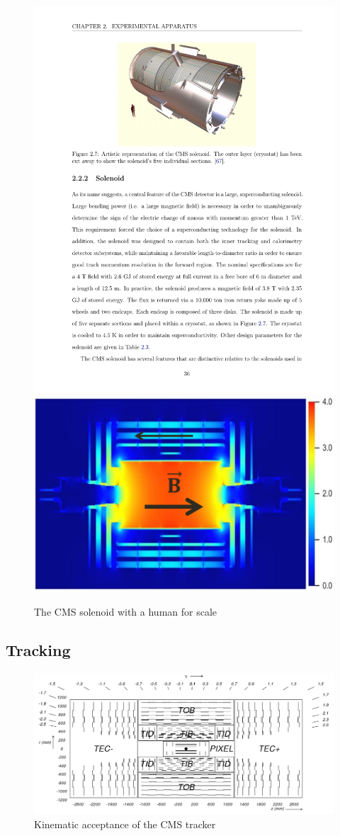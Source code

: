 \begin{figure}
\begin{center}
\includegraphics[width=.45\textwidth]{pics/solenoid_diagram}
\includegraphics[width=.45\textwidth]{pics/b_field}
\end{center}
\caption{The CMS solenoid with a human for scale}
\label{fig:solenoid_bfield}
\end{figure}


\subsection{Tracking}

\begin{figure}
\begin{center}
\includegraphics[width=.95\textwidth]{pics/tracker_diagram}
\end{center}
\caption{Kinematic acceptance of the CMS tracker}
\label{fig:tracker_diagram}
\end{figure}

